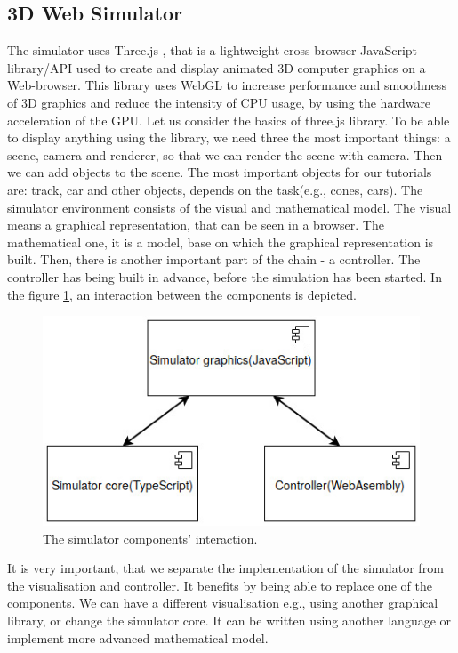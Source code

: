 \subsection{3D Web Simulator}
The simulator uses Three.js \cite{ThreeJS}, that is a lightweight cross-browser JavaScript library/API used to create and display animated 3D computer graphics on a Web-browser. This library uses WebGL \cite{WebGL} to increase performance and smoothness of 3D graphics and reduce the intensity of CPU usage, by using the hardware acceleration of the GPU.\newline
Let us consider the basics of three.js library. To be able to display anything using the library, we need three the most important things: a scene, camera and renderer, so that we can render the scene with camera. Then we can add objects to the scene. The most important objects for our tutorials are: track, car and other objects, depends on the task(e.g., cones, cars).\newline
The simulator environment consists of the visual and mathematical model. The visual means a graphical representation, that can be seen in a browser. The mathematical one, it is a model, base on which the graphical representation is built. Then, there is another important part of the chain - a controller. The controller has being built in advance, before the simulation has been started. In the figure \ref{fig:simulator-scheme}, an interaction between the components is depicted.
\begin{figure}[h!]
    \centering
    \includegraphics[width=0.7\linewidth]{src/pic/simulator-scheme}
    \caption{The simulator components' interaction.}
    \label{fig:simulator-scheme}
\end{figure} \newline
It is very important, that we separate the implementation of the simulator from the visualisation and controller. It benefits by being able to replace one of the components. We can have a different visualisation e.g., using another graphical library, or change the simulator core. It can be written using another language or implement more advanced mathematical model. 

